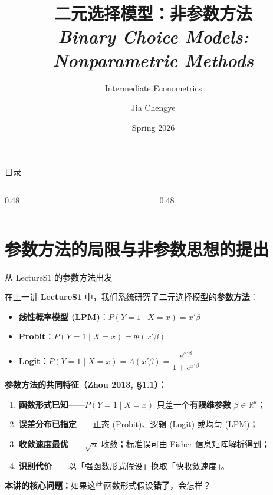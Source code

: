 \documentclass[aspectratio=169, 10pt]{beamer}
\title[Binary Choice -- Nonparametric]{%
  二元选择模型：非参数方法 \\[4pt]
  {\normalsize\itshape Binary Choice Models: Nonparametric Methods}}
\subtitle{Intermediate Econometrics}
\author[Jia Chengye / SUFE]{Jia Chengye}
\institute{%
  School of Economics \\
  Shandong University of Finance and Economics}
\date{Spring 2026}
\begin{document}

\begin{frame}[plain]
  \titlepage
\end{frame}

\begin{frame}{目录}
  \begin{columns}[T]
    \begin{column}{0.48\textwidth}
      \tableofcontents[sections={1-6}]
    \end{column}
    \begin{column}{0.48\textwidth}
      \tableofcontents[sections={7-12}]
    \end{column}
  \end{columns}
\end{frame}



\section{参数方法的局限与非参数思想的提出}

\begin{frame}{从 LectureS1 的参数方法出发}

  在上一讲 \textbf{LectureS1} 中，我们系统研究了二元选择模型的\textbf{参数方法}：
  \begin{itemize}
    \item \textbf{线性概率模型 (LPM)}：$P(Y=1\mid X=x) = x'\beta$
    \item \textbf{Probit}：$P(Y=1\mid X=x) = \Phi(x'\beta)$
    \item \textbf{Logit}：$P(Y=1\mid X=x) = \Lambda(x'\beta) = \dfrac{e^{x'\beta}}{1+e^{x'\beta}}$
  \end{itemize}


  \begin{keybox}
    \textbf{参数方法的共同特征（Zhou 2013, §1.1）：}
    \begin{enumerate}
      \item \textbf{函数形式已知}——$P(Y=1\mid X=x)$ 只差一个\textbf{有限维参数} $\beta \in \mathbb{R}^k$；
      \item \textbf{误差分布已指定}——正态 (Probit)、逻辑 (Logit) 或均匀 (LPM)；
      \item \textbf{收敛速度最优}——$\sqrt{n}$ 收敛；标准误可由 Fisher 信息矩阵解析得到；
      \item \textbf{识别代价}——以「强函数形式假设」换取「快收敛速度」。
    \end{enumerate}
  \end{keybox}

  \textbf{本讲的核心问题：}如果这些函数形式假设\textbf{错了}，会怎样？

\end{frame}
\end{document}
